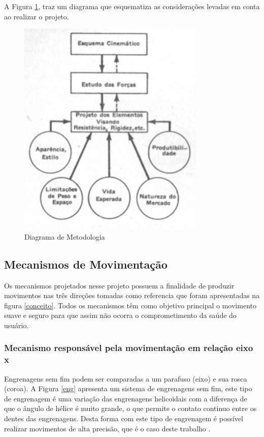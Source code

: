 A Figura \ref{met}, traz um diagrama que esquematiza as considerações levadas em conta ao realizar o projeto.

\begin{figure}[H]
		\centering
			\includegraphics[scale=1.0]{figuras/met.png}
		\caption{Diagrama de Metodologia \cite{shigley}}
		\label{met}
\end{figure}

\subsection[Mecanismos de Movimentação]{Mecanismos de Movimentação}

Os mecanismos projetados nesse projeto possuem a finalidade de produzir movimentos nas três direções tomadas como referencia que foram apresentadas na figura \ref{conceito}. Todos os mecanismos têm como objetivo principal o movimento suave e seguro para que assim não ocorra o comprometimento da saúde do usuário.

\subsubsection[Mecanismo responsável pela movimentação em relação eixo x]{Mecanismo responsável pela movimentação em relação eixo x}

Engrenagens sem fim podem ser comparadas a um parafuso (eixo) e sua rosca (coroa). A Figura \ref{eng} apresenta um sistema de engrenagens sem fim, este tipo de engrenagem é uma variação das engrenagens helicoidais com a diferença de que o ângulo de hélice é muito grande, o que permite o contato continuo entre os dentes das engrenagens. Desta forma com este tipo de engrenagem é possível realizar movimentos de alta precisão, que é o caso deste trabalho \cite{norton}.

